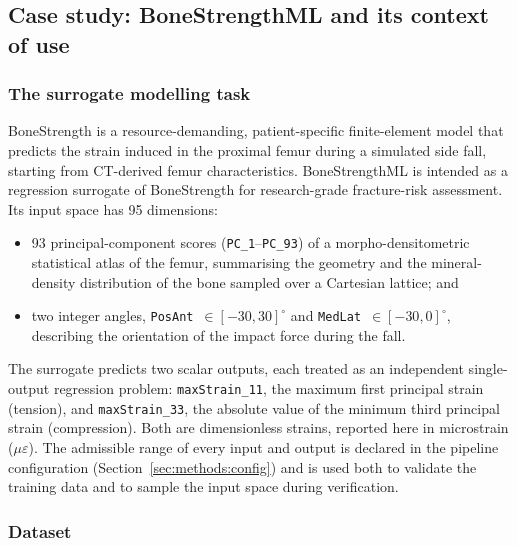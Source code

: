 \subsection{Case study: BoneStrengthML and its context of use}
\label{sec:methods:case}

\subsubsection{The surrogate modelling task}

BoneStrength is a resource-demanding, patient-specific finite-element
model that predicts the strain induced in the proximal femur during a
simulated side fall, starting from CT-derived femur characteristics.
BoneStrengthML is intended as a regression surrogate of BoneStrength for
research-grade fracture-risk assessment. Its input space has 95
dimensions:

\begin{itemize}
  \item 93 principal-component scores (\texttt{PC\_1}--\texttt{PC\_93}) of a
    morpho-densitometric statistical atlas of the femur, summarising the
    geometry and the mineral-density distribution of the bone sampled over a
    Cartesian lattice; and
  \item two integer angles, \texttt{PosAnt}~$\in[-30, 30]^\circ$ and
    \texttt{MedLat}~$\in[-30, 0]^\circ$, describing the orientation of the
    impact force during the fall.
\end{itemize}

The surrogate predicts two scalar outputs, each treated as an independent
single-output regression problem: \texttt{maxStrain\_11}, the maximum first
principal strain (tension), and \texttt{maxStrain\_33}, the absolute value of
the minimum third principal strain (compression). Both are dimensionless
strains, reported here in microstrain ($\mu\varepsilon$).
The admissible range of every input and output is declared in the pipeline
configuration (Section~\ref{sec:methods:config}) and is used both to validate
the training data and to sample the input space during verification.

\subsubsection{Dataset}

